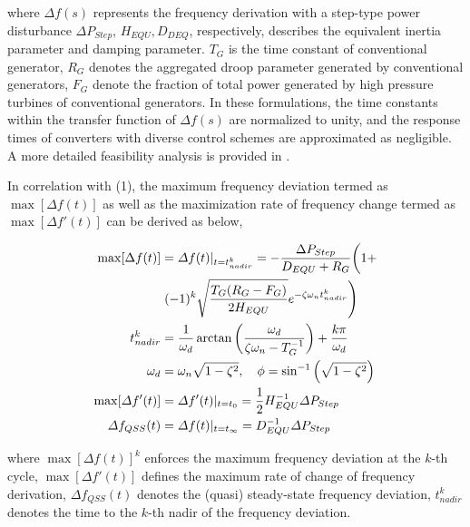 \documentclass[lettersize,journal]{IEEEtran}
\begin{document}
\noindent
where $\varDelta f(s)$ represents the frequency derivation with a step-type power disturbance $\varDelta P_{Step}$, $H_{EQU},\! D_{DEQ}$, respectively, describes the equivalent inertia parameter and damping parameter. $T_G$ is the time constant of conventional generator, $R_G$ denotes the aggregated droop parameter generated by conventional generators, $F_G$ denote the fraction of total power generated by high pressure turbines of conventional generators. In these formulations, the time constants within the transfer function of $\varDelta f(s)$ are normalized to unity, and the response times of converters with diverse control schemes are approximated as negligible. A more detailed feasibility analysis is provided in \cite{markovic2019optimal}.

In correlation with (1), the maximum frequency deviation termed as $\max[ \varDelta f(t)]$ as well as the maximization rate of frequency change termed as $\max[\varDelta f'(t)]$ can be derived as below,

\vspace{-0.5cm}
\begin{subequations}
\begin{align}
    \max[\Delta f(t)] &= \varDelta f(t)|_{t=t_{nadir}^k} = -\frac{\Delta P_{Step}}{D_{EQU} + R_G} \bigg( 1 + \notag \\
                      &\left. (-1)^k \sqrt{\frac{T_G(R_G - F_G)}{2H_{EQU}}} e^{-\zeta \omega_n t_{nadir}^k} \right) \label{eq:max_delta_f}\\
    t_{nadir}^k &= \frac{1}{\omega_d} \arctan \left( \frac{\omega_d}{\zeta \omega_n - T_G^{-1}} \right) + \frac{k\pi}{\omega_d}\notag  \\
    \omega_d &= \omega_n \sqrt{1 - \zeta^2}, \quad \phi = \sin^{-1} \left( \sqrt{1 - \zeta^2} \right) \notag\\
  \max[\varDelta f'(t)] &= \varDelta f'(t)|_{t=t_{0}} = \frac{1}{2} H_{EQU}^{-1}\varDelta P_{Step} \label{eq:max_rocof}\\
  \varDelta f_{QSS}(t) &= \varDelta f(t)|_{t=t_{\infty}} = {D_{EQU}^{-1}\varDelta P_{Step}} \label{eq:qss}
\end{align}
\end{subequations}

\noindent
where $\max [\varDelta f(t)]^k$ enforces the maximum frequency deviation at the $k$-th cycle, $\max [\varDelta f'(t)]$ defines the maximum rate of change of frequency derivation, $\varDelta f_{QSS} (t)$ denotes the (quasi) steady-state frequency deviation, $t_{nadir}^k$ denotes the time to the $k$-th nadir of the frequency deviation.
\end{document}
